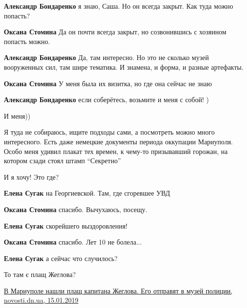 \begin{itemize} %
\textbf{Александр Бондаренко} я знаю, Саша. Но он всегда закрыт. Как туда можно попасть?

\textbf{Оксана Стомина} Да он почти всегда закрыт, но созвонившись с хозяином попасть можно.

\textbf{Александр Бондаренко} Да, там интересно. Но это не сколько музей вооруженных сил, там шире тематика. И знамена, и форма, и разные артефакты.

\textbf{Оксана Стомина} У меня была их визитка, но где она сейчас не знаю

\textbf{Александр Бондаренко} если соберётесь, возьмите и меня с собой! )


И меня))


Я туда не собираюсь, ищите подходы сами, а посмотреть можно много интересного.
Есть даже немецкие документы периода оккупации Мариуполя. Особо меня удивил
плакат тех времен, к чему-то призывавший горожан, на котором сзади стоял штамп
\enquote{Секретно} 

\end{itemize} %


И я хочу! Это где?

\begin{itemize} %
\textbf{Елена Сугак} на Георгиевской. Там, где сгоревшее УВД

\textbf{Оксана Стомина} спасибо. Вычухаюсь, посещу.

\textbf{Елена Сугак} скорейшего выздоровления!

\textbf{Оксана Стомина} спасибо. Лет 10 не болела...

\textbf{Елена Сугак} а сейчас что случилось?
\end{itemize} %


То там є плащ Жеглова?

\href{https://novosti.dn.ua/ru/zhuzhalka/252-v-maryupole-nashly-plashh-kapytana-zheglova-ego-otpravyat-v-muzey-polycyy}{%
В Мариуполе нашли плащ капитана Жеглова. Его отправят в музей полиции, novosti.dn.ua, 15.01.2019%
}

